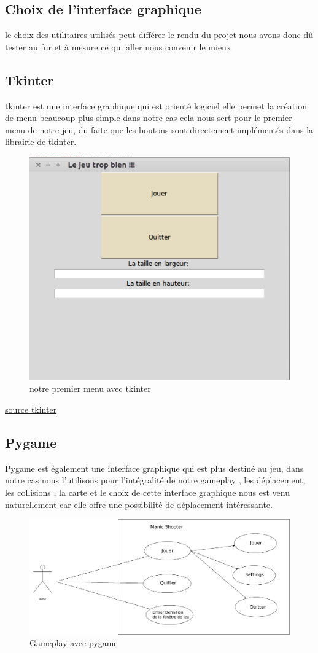 \documentclass[a4paper, 11pt]{article}
\begin{document}
\subsection{Choix de l'interface graphique}

le choix des utilitaires utilisés peut différer le rendu du projet nous avons donc dû tester au fur et à mesure ce qui aller nous convenir le mieux

\subsection{Tkinter}
tkinter est une interface graphique qui est orienté logiciel elle permet la création de menu beaucoup plus simple dans notre cas cela nous sert pour le premier menu de notre jeu, du faite que les boutons sont directement
implémentés dans la librairie de tkinter.
 \begin{figure}[ht!]
 \centering
 \includegraphics[width=0.7\linewidth]{tkinter.png}
 \caption{notre premier menu avec tkinter}
 \label{fig::example::one}
\end{figure}

\href{https://www.tutorialspoint.com/python/python_gui_programming.htm}{source tkinter}

\subsection{Pygame}
Pygame est également une interface graphique qui est plus destiné au jeu,
dans notre cas nous l'utilisons pour l'intégralité de notre gameplay , les déplacement, les collisions , la carte et le choix de cette interface graphique nous est venu naturellement car elle offre une possibilité de déplacement intéressante.
 \begin{figure}[ht!]
 \centering
 \includegraphics[width=0.5\linewidth]{diag.png}
 \caption{Gameplay avec pygame}
 \label{fig::example::one}
\end{figure}
\end{document}
